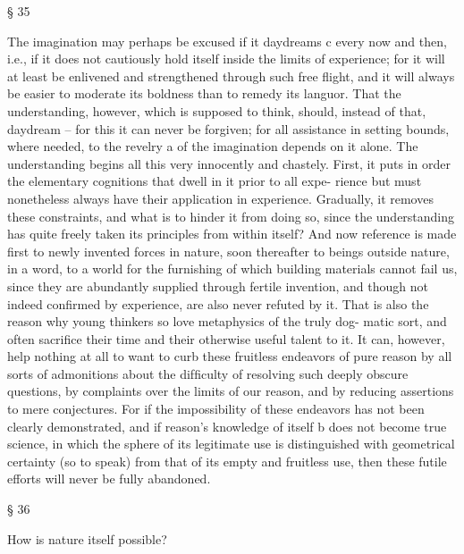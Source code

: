 § 35

The imagination may perhaps be excused if it daydreams c every now
and then, i.e., if it does not cautiously hold itself inside the limits of
experience; for it will at least be enlivened and strengthened through
such free ﬂight, and it will always be easier to moderate its boldness
than to remedy its languor. That the understanding, however, which is
supposed to think, should, instead of that, daydream – for this it can never
be forgiven; for all assistance in setting bounds, where needed, to the
revelry a of the imagination depends on it alone.
The understanding begins all this very innocently and chastely. First,
it puts in order the elementary cognitions that dwell in it prior to all expe-
rience but must nonetheless always have their application in experience.
Gradually, it removes these constraints, and what is to hinder it from
doing so, since the understanding has quite freely taken its principles
from within itself? And now reference is made ﬁrst to newly invented
forces in nature, soon thereafter to beings outside nature, in a word, to a
world for the furnishing of which building materials cannot fail us, since
they are abundantly supplied through fertile invention, and though not
indeed conﬁrmed by experience, are also never refuted by it. That is
also the reason why young thinkers so love metaphysics of the truly dog-
matic sort, and often sacriﬁce their time and their otherwise useful talent
to it.
It can, however, help nothing at all to want to curb these fruitless
endeavors of pure reason by all sorts of admonitions about the difﬁculty
of resolving such deeply obscure questions, by complaints over the limits
of our reason, and by reducing assertions to mere conjectures. For if the
impossibility of these endeavors has not been clearly demonstrated, and if
reason’s knowledge of itself b does not become true science, in which the
sphere of its legitimate use is distinguished with geometrical certainty
(so to speak) from that of its empty and fruitless use, then these futile
efforts will never be fully abandoned.

§ 36

How is nature itself possible?

